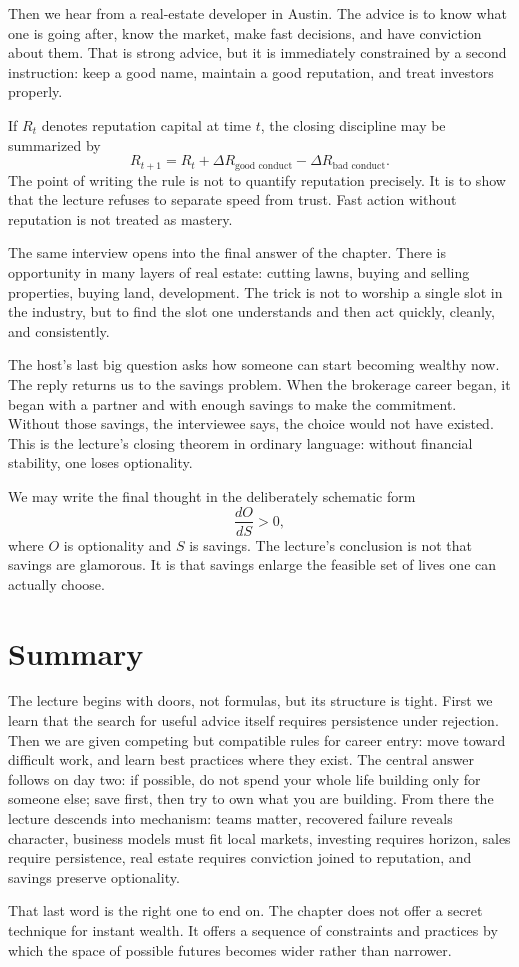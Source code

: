 Then we hear from a real-estate developer in Austin. The advice is to know what one is going after, know the market, make fast decisions, and have conviction about them. That is strong advice, but it is immediately constrained by a second instruction: keep a good name, maintain a good reputation, and treat investors properly.

If \(R_t\) denotes reputation capital at time \(t\), the closing discipline may be summarized by
\begin{equation}
R_{t+1}=R_t+\Delta R_{\text{good conduct}}-\Delta R_{\text{bad conduct}}.
\end{equation}
The point of writing the rule is not to quantify reputation precisely. It is to show that the lecture refuses to separate speed from trust. Fast action without reputation is not treated as mastery.

The same interview opens into the final answer of the chapter. There is opportunity in many layers of real estate: cutting lawns, buying and selling properties, buying land, development. The trick is not to worship a single slot in the industry, but to find the slot one understands and then act quickly, cleanly, and consistently.

The host's last big question asks how someone can start becoming wealthy now. The reply returns us to the savings problem. When the brokerage career began, it began with a partner and with enough savings to make the commitment. Without those savings, the interviewee says, the choice would not have existed. This is the lecture's closing theorem in ordinary language: without financial stability, one loses optionality.

We may write the final thought in the deliberately schematic form
\begin{equation}
\frac{dO}{dS}>0,
\end{equation}
where \(O\) is optionality and \(S\) is savings. The lecture's conclusion is not that savings are glamorous. It is that savings enlarge the feasible set of lives one can actually choose.

\section{Summary}

The lecture begins with doors, not formulas, but its structure is tight. First we learn that the search for useful advice itself requires persistence under rejection. Then we are given competing but compatible rules for career entry: move toward difficult work, and learn best practices where they exist. The central answer follows on day two: if possible, do not spend your whole life building only for someone else; save first, then try to own what you are building. From there the lecture descends into mechanism: teams matter, recovered failure reveals character, business models must fit local markets, investing requires horizon, sales require persistence, real estate requires conviction joined to reputation, and savings preserve optionality.

That last word is the right one to end on. The chapter does not offer a secret technique for instant wealth. It offers a sequence of constraints and practices by which the space of possible futures becomes wider rather than narrower.
